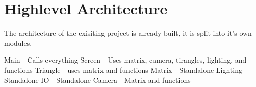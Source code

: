 \chapter*{Highlevel Architecture}

The architecture of the exisiting project is already built, it is split into it's own modules.

Main - Calls everything
Screen - Uses matrix, camera, tirangles, lighting, and functions
Triangle - uses matrix and functions
Matrix - Standalone
Lighting - Standalone
IO - Standalone
Camera - Matrix and functions


